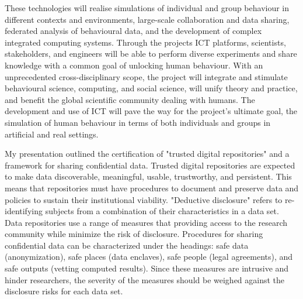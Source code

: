 \documentclass[a4paper,UKenglish]{dagrep}
\begin{document}
These technologies will realise simulations of individual and group behaviour in
different contexts and environments, large-scale collaboration and data sharing,
federated analysis of behavioural data, and the development of complex
integrated computing systems. Through the projects ICT platforms, scientists,
stakeholders, and engineers will be able to perform diverse experiments and
share knowledge with a common goal of unlocking human behaviour. With an
unprecedented cross-disciplinary scope, the project will integrate and stimulate
behavioural science, computing, and social science, will unify theory and
practice, and benefit the global scientific community dealing with humans. The
development and use of ICT will pave the way for the project's ultimate goal,
the simulation of human behaviour in terms of both individuals and groups in
artificial and real settings. 


{}
\license
My presentation outlined the certification of "trusted digital repositories" and a framework for 
sharing confidential data.  Trusted digital repositories are expected to make data discoverable, 
meaningful, usable, trustworthy, and persistent.  This means that repositories must have 
procedures to document and preserve data and policies to sustain their institutional viability.   
"Deductive disclosure" refers to re-identifying subjects from a combination of their 
characteristics in a data set.  Data repositories use a range of measures that providing access 
to the research community while minimize the risk of disclosure.  Procedures for sharing 
confidential data can be characterized under the headings: safe data (anonymization), safe 
places (data enclaves), safe people (legal agreements), and safe outputs (vetting computed 
results).   Since these measures are intrusive and hinder researchers, the severity of the 
measures should be weighed against the disclosure risks for each data set. 
  
\end{document}
